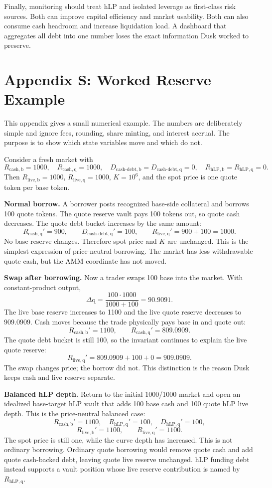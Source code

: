 \documentclass[11pt]{article}
\newcommand{\base}{\mathrm{b}}
\newcommand{\qasset}{\mathrm{q}}
\newcommand{\cash}{\mathrm{cash}}
\newcommand{\live}{\mathrm{live}}
\newcommand{\hlp}{\mathrm{hLP}}
\newcommand{\debt}{\mathrm{debt}}
\begin{document}
Finally, monitoring should treat hLP and isolated leverage as first-class risk sources. Both can improve capital efficiency and market usability. Both can also consume cash headroom and increase liquidation load. A dashboard that aggregates all debt into one number loses the exact information Dusk worked to preserve.

\section{Appendix S: Worked Reserve Example}

This appendix gives a small numerical example. The numbers are deliberately simple and ignore fees, rounding, share minting, and interest accrual. The purpose is to show which state variables move and which do not.

Consider a fresh market with
\[
R_{\cash,\base}=1000,\quad R_{\cash,\qasset}=1000,\quad
D_{\cash\text{-}\debt,\base}=D_{\cash\text{-}\debt,\qasset}=0,\quad
R_{\hlp,\base}=R_{\hlp,\qasset}=0.
\]
Then $R_{\live,\base}=1000$, $R_{\live,\qasset}=1000$, $K=10^6$, and the spot price is one quote token per base token.

\textbf{Normal borrow.} A borrower posts recognized base-side collateral and borrows 100 quote tokens. The quote reserve vault pays 100 tokens out, so quote cash decreases. The quote debt bucket increases by the same amount:
\[
R_{\cash,\qasset}'=900,\qquad
D_{\cash\text{-}\debt,\qasset}'=100,\qquad
R_{\live,\qasset}'=900+100=1000.
\]
No base reserve changes. Therefore spot price and $K$ are unchanged. This is the simplest expression of price-neutral borrowing. The market has less withdrawable quote cash, but the AMM coordinate has not moved.

\textbf{Swap after borrowing.} Now a trader swaps 100 base into the market. With constant-product output,
\[
\Delta \qasset = \frac{100\cdot 1000}{1000+100}=90.9091.
\]
The live base reserve increases to 1100 and the live quote reserve decreases to 909.0909. Cash moves because the trade physically pays base in and quote out:
\[
R_{\cash,\base}'=1100,\qquad
R_{\cash,\qasset}'=809.0909.
\]
The quote debt bucket is still 100, so the invariant continues to explain the live quote reserve:
\[
R_{\live,\qasset}'=809.0909+100+0=909.0909.
\]
The swap changes price; the borrow did not. This distinction is the reason Dusk keeps cash and live reserve separate.

\textbf{Balanced hLP depth.} Return to the initial 1000/1000 market and open an idealized base-target hLP vault that adds 100 base cash and 100 quote hLP live depth. This is the price-neutral balanced case:
\[
R_{\cash,\base}'=1100,\quad
R_{\hlp,\qasset}'=100,\quad
D_{\hlp,\qasset}'=100,
\]
\[
R_{\live,\base}'=1100,\qquad
R_{\live,\qasset}'=1100.
\]
The spot price is still one, while the curve depth has increased. This is not ordinary borrowing. Ordinary quote borrowing would remove quote cash and add quote cash-backed debt, leaving quote live reserve unchanged. hLP funding debt instead supports a vault position whose live reserve contribution is named by $R_{\hlp,\qasset}$.
\end{document}
